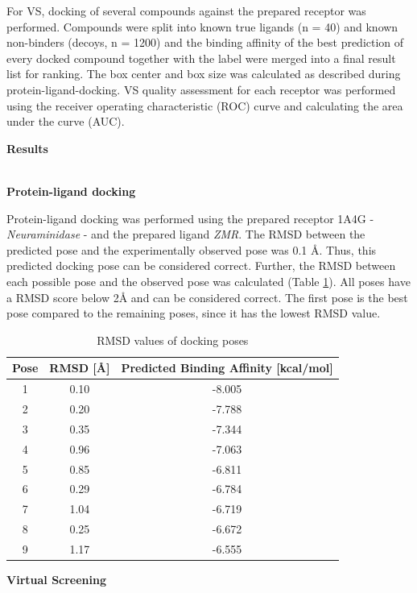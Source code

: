 \documentclass[a4paper,10pt]{article}
\begin{document}
For VS, docking of several compounds against the prepared receptor was performed. Compounds were split into known true ligands (n = 40) and known non-binders (decoys, n = 1200) and the binding affinity of the best prediction of every docked compound together with the label were merged into a final result list for ranking. The box center and box size was calculated as described during protein-ligand-docking.
VS quality assessment for each receptor was performed using the receiver operating characteristic (ROC) curve and calculating the area under the curve (AUC).


\begin{large}
	\vspace{0.5cm}
	\textbf{Results}
\end{large}	\\ [1mm]

\textbf{Protein-ligand docking}

Protein-ligand docking was performed using the prepared receptor 1A4G - \textit{Neuraminidase} - and the prepared ligand \textit{ZMR}. The RMSD between the predicted pose and the experimentally observed pose was 0.1 Å. Thus, this predicted docking pose can be considered correct. Further, the RMSD between each possible pose and the observed pose was calculated (Table \ref{tab:rmsd}). All poses have a RMSD score below 2Å and can be considered correct. The first pose is the best pose compared to the remaining poses, since it has the lowest RMSD value.


\begin{table}[h!]
\centering
\caption{RMSD values of docking poses}
\label{tab:rmsd}
\begin{tabular}{|c|c|c|}
\hline
\textbf{Pose} & \textbf{RMSD [\AA]} & \textbf{Predicted Binding Affinity [kcal/mol]} \\
\hline
1 & 0.10 & -8.005\\
2 & 0.20 & -7.788\\
3 & 0.35 & -7.344\\
4 & 0.96 & -7.063\\
5 & 0.85 & -6.811\\
6 & 0.29 & -6.784 \\
7 & 1.04 & -6.719 \\
8 & 0.25 & -6.672\\
9 & 1.17 & -6.555 \\
\hline
\end{tabular}
\end{table}


\textbf{Virtual Screening}
\end{document}
